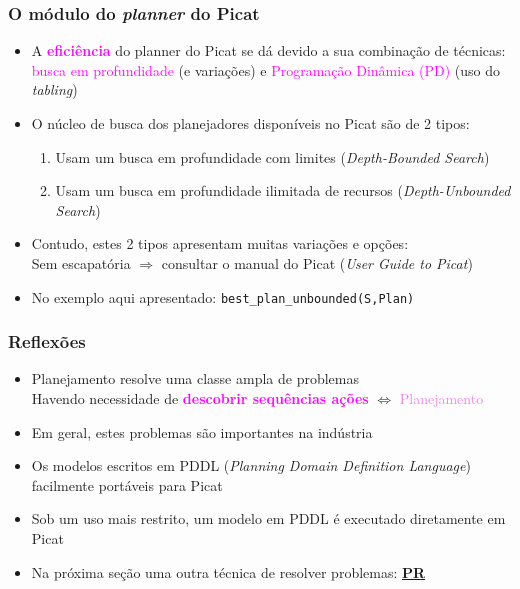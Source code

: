 \begin{frame}[fragile]
 \frametitle{O módulo do \textit{planner} do Picat}

\begin{itemize}

 \item A \textcolor{magenta}{\textbf{eficiência}} do planner do Picat se dá devido a sua combinação
       de técnicas: \textcolor{magenta}{busca em profundidade} (e variações) e \textcolor{magenta}{Programação
       Dinâmica (PD)} (uso do \textit{tabling})


  \pause 
  \item O núcleo de busca dos planejadores  disponíveis no Picat são de 2 tipos:
  \begin{enumerate}
    \item Usam um busca em profundidade com limites (\textit{Depth-Bounded Search})
    \item Usam um busca em profundidade ilimitada de recursos (\textit{Depth-Unbounded Search}) 
  \end{enumerate}
  
  \item Contudo, estes 2 tipos apresentam muitas variações e opções:\\
  \pause
  Sem escapatória $\Rightarrow $ consultar o manual do Picat (\textit{User Guide to Picat})
  
  \item No exemplo aqui apresentado: 
  \texttt{best\_plan\_unbounded(S,Plan)}   
\end{itemize}
\end{frame}




\begin{frame}[fragile]
\frametitle{Reflexões}


\begin{itemize}
  \item Planejamento resolve uma classe ampla de problemas\\
   Havendo necessidade de
    \textcolor{magenta}{\textbf{descobrir sequências ações}} $\Leftrightarrow$ \textcolor{violet}{Planejamento}

  \pause
  \item Em geral, estes problemas são importantes na indústria

  \pause
  \item Os modelos escritos em PDDL (\textit{Planning Domain Definition Language})
  facilmente portáveis para Picat
    \pause
  \item Sob um uso mais restrito, um modelo em PDDL é executado diretamente em Picat
    
  \pause
  \item Na próxima seção uma outra técnica de resolver problemas: \textbf{\underline{PR}}
\end{itemize}

\end{frame}
